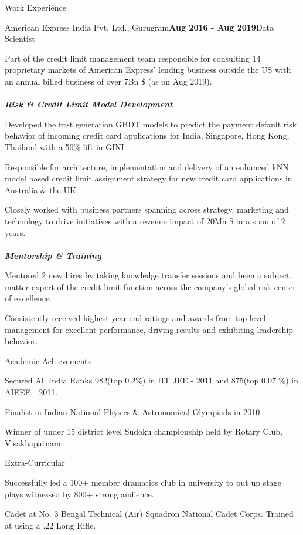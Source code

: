 \documentclass{resume}
\begin{document}
\begin{rSection}{Work Experience}
\begin{rSubsection}{American Express India Pvt. Ltd., Gurugram}{\textbf{Aug 2016 - Aug 2019}}{Data Scientist}{}
 \item Part of the credit limit management team responsible for consulting 14 proprietary markets of American Express' lending business outside the US with an annual billed business of over 7Bn \$ (as on Aug 2019).\\\\
{\textbf{\textit{Risk \& Credit Limit Model Development}}}
 \item Developed the first generation GBDT models to predict the payment default risk behavior of incoming credit card applications for India, Singapore, Hong Kong, Thailand with a 50\% lift in GINI
 \item Responsible for architecture, implementation and delivery of an enhanced kNN model based credit limit assignment strategy for new credit card applications in Australia \& the UK.
 \item Closely worked with business partners spanning across strategy, marketing and technology to drive initiatives with a revenue impact of 20Mn \$ in a span of 2 years.\\\\
{\textbf{\textit{Mentorship \& Training}}}
 \item Mentored 2 new hires by taking knowledge transfer sessions and been a subject matter expert of the credit limit function across the company's global risk center of excellence.
  \item Consistently received highest year end ratings and awards from top level management for excellent performance, driving results and exhibiting leadership behavior.
\end{rSubsection}

\end{rSection}
% 
\begin{rSection}{Academic Achievements} 
\item Secured All India Ranks 982(top 0.2\%) in IIT JEE - 2011 and 875(top 0.07 \%) in AIEEE - 2011.
\item Finalist in Indian National Physics \& Astronomical Olympiads in 2010.
\item Winner of under 15 district level Sudoku championship held by Rotary Club, Visakhapatnam.
\end{rSection}

\begin{rSection}{Extra-Curricular} 
\item Successfully led a 100+ member dramatics club in university to put up stage plays witnessed by 800+ strong audience.
\item Cadet at No. 3 Bengal Technical (Air) Squadron National Cadet Corps. Trained at using a .22 Long Rifle.
\end{rSection}
\end{document}
